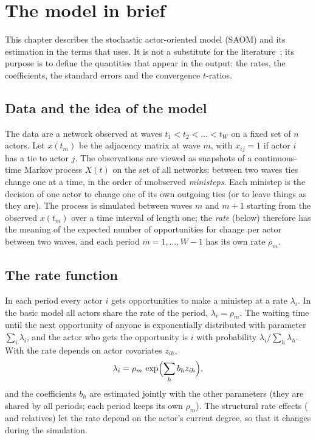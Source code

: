 \chapter{The model in brief}\label{ch:model}

This chapter describes the stochastic actor-oriented model (SAOM) and its estimation in the terms that \nwsaom{} uses. It is not a substitute for the literature~\cite{snijders2010,ripley}; its purpose is to define the quantities that appear in the output: the rates, the coefficients, the standard errors and the convergence $t$-ratios.

\section{Data and the idea of the model}

The data are a network observed at waves $t_1<t_2<\dots<t_W$ on a fixed set of $n$ actors. Let $x(t_m)$ be the adjacency matrix at wave $m$, with $x_{ij}=1$ if actor $i$ has a tie to actor $j$. The observations are viewed as snapshots of a continuous-time Markov process $X(t)$ on the set of all networks: between two waves ties change one at a time, in the order of unobserved \emph{ministeps}. Each ministep is the decision of one actor to change one of its own outgoing ties (or to leave things as they are). The process is simulated between waves $m$ and $m+1$ starting from the observed $x(t_m)$ over a time interval of length one; the \emph{rate} (below) therefore has the meaning of the expected number of opportunities for change per actor between two waves, and each period $m=1,\dots,W-1$ has its own rate $\rho_m$.

\section{The rate function}

In each period every actor $i$ gets opportunities to make a ministep at a rate $\lambda_i$. In the basic model all actors share the rate of the period, $\lambda_i=\rho_m$. The waiting time until the next opportunity of anyone is exponentially distributed with parameter $\sum_i\lambda_i$, and the actor who gets the opportunity is $i$ with probability $\lambda_i/\sum_h\lambda_h$. With  the rate depends on actor covariates $z_{ih}$,
\begin{equation}
  \lambda_i = \rho_m\,\exp\Bigl(\sum_h b_h z_{ih}\Bigr),
\end{equation}
and the coefficients $b_h$ are estimated jointly with the other parameters (they are shared by all periods; each period keeps its own $\rho_m$). The structural rate effects ( and relatives) let the rate depend on the actor's current degree, so that it changes during the simulation.


